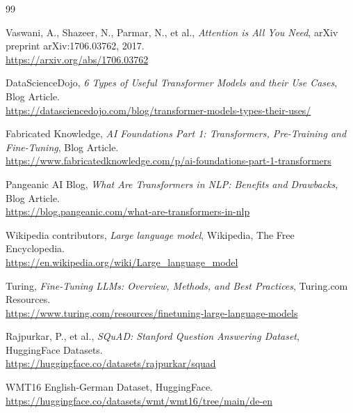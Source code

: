 \begin{thebibliography}{99}

    Vaswani, A., Shazeer, N., Parmar, N., et al., \textit{Attention is All You Need}, arXiv preprint arXiv:1706.03762, 2017.\\
    \href{https://arxiv.org/abs/1706.03762}{https://arxiv.org/abs/1706.03762}

    DataScienceDojo, \textit{6 Types of Useful Transformer Models and their Use Cases}, Blog Article.\\
    \href{https://datasciencedojo.com/blog/transformer-models-types-their-uses/}{https://datasciencedojo.com/blog/transformer-models-types-their-uses/}

    Fabricated Knowledge, \textit{AI Foundations Part 1: Transformers, Pre-Training and Fine-Tuning}, Blog Article.\\
    \href{https://www.fabricatedknowledge.com/p/ai-foundations-part-1-transformers}{https://www.fabricatedknowledge.com/p/ai-foundations-part-1-transformers}

    Pangeanic AI Blog, \textit{What Are Transformers in NLP: Benefits and Drawbacks}, Blog Article.\\
    \href{https://blog.pangeanic.com/what-are-transformers-in-nlp}{https://blog.pangeanic.com/what-are-transformers-in-nlp}

    Wikipedia contributors, \textit{Large language model}, Wikipedia, The Free Encyclopedia.\\
    \href{https://en.wikipedia.org/wiki/Large\_language\_model}{https://en.wikipedia.org/wiki/Large\_language\_model}

    Turing, \textit{Fine-Tuning LLMs: Overview, Methods, and Best Practices}, Turing.com Resources.\\
    \href{https://www.turing.com/resources/finetuning-large-language-models}{https://www.turing.com/resources/finetuning-large-language-models}

    Rajpurkar, P., et al., \textit{SQuAD: Stanford Question Answering Dataset}, HuggingFace Datasets.\\
    \href{https://huggingface.co/datasets/rajpurkar/squad}{https://huggingface.co/datasets/rajpurkar/squad}

    WMT16 English-German Dataset, HuggingFace.\\
    \href{https://huggingface.co/datasets/wmt/wmt16/tree/main/de-en}{https://huggingface.co/datasets/wmt/wmt16/tree/main/de-en}


\end{thebibliography}
